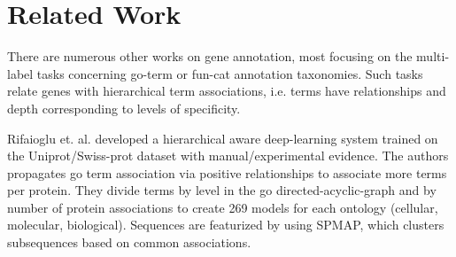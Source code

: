 \section{Related Work}
There are numerous other works on gene annotation, most focusing on the multi-label tasks concerning go-term or fun-cat annotation taxonomies. Such tasks relate genes with hierarchical term associations, i.e. terms have relationships and depth corresponding to levels of specificity. 

Rifaioglu et. al. \cite {1705.04802} developed a hierarchical aware deep-learning system trained on the Uniprot/Swiss-prot dataset with manual/experimental evidence. The authors propagates go term association via positive relationships to associate more terms per protein. They divide terms by level in the go directed-acyclic-graph and by number of protein associations to create 269 models for each ontology (cellular, molecular, biological). Sequences are featurized by using SPMAP, which clusters subsequences based on common associations.